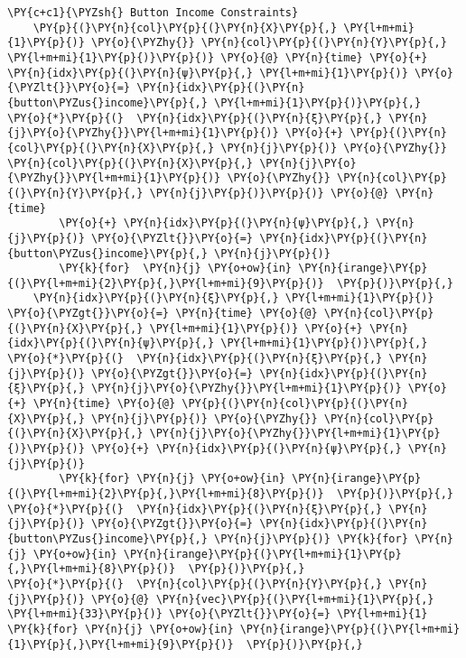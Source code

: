 \begin{tcolorbox}[breakable, size=fbox, boxrule=1pt, pad at break*=1mm,colback=cellbackground, colframe=cellborder]
\begin{Verbatim}[commandchars=\\\{\}]
    \PY{c+c1}{\PYZsh{} Button Income Constraints}
    \PY{p}{(}\PY{n}{col}\PY{p}{(}\PY{n}{X}\PY{p}{,} \PY{l+m+mi}{1}\PY{p}{)} \PY{o}{\PYZhy{}} \PY{n}{col}\PY{p}{(}\PY{n}{Y}\PY{p}{,} \PY{l+m+mi}{1}\PY{p}{)}\PY{p}{)} \PY{o}{@} \PY{n}{time} \PY{o}{+} \PY{n}{idx}\PY{p}{(}\PY{n}{ψ}\PY{p}{,} \PY{l+m+mi}{1}\PY{p}{)} \PY{o}{\PYZlt{}}\PY{o}{=} \PY{n}{idx}\PY{p}{(}\PY{n}{button\PYZus{}income}\PY{p}{,} \PY{l+m+mi}{1}\PY{p}{)}\PY{p}{,}
\PY{o}{*}\PY{p}{(}  \PY{n}{idx}\PY{p}{(}\PY{n}{ξ}\PY{p}{,} \PY{n}{j}\PY{o}{\PYZhy{}}\PY{l+m+mi}{1}\PY{p}{)} \PY{o}{+} \PY{p}{(}\PY{n}{col}\PY{p}{(}\PY{n}{X}\PY{p}{,} \PY{n}{j}\PY{p}{)} \PY{o}{\PYZhy{}} \PY{n}{col}\PY{p}{(}\PY{n}{X}\PY{p}{,} \PY{n}{j}\PY{o}{\PYZhy{}}\PY{l+m+mi}{1}\PY{p}{)} \PY{o}{\PYZhy{}} \PY{n}{col}\PY{p}{(}\PY{n}{Y}\PY{p}{,} \PY{n}{j}\PY{p}{)}\PY{p}{)} \PY{o}{@} \PY{n}{time}
        \PY{o}{+} \PY{n}{idx}\PY{p}{(}\PY{n}{ψ}\PY{p}{,} \PY{n}{j}\PY{p}{)} \PY{o}{\PYZlt{}}\PY{o}{=} \PY{n}{idx}\PY{p}{(}\PY{n}{button\PYZus{}income}\PY{p}{,} \PY{n}{j}\PY{p}{)}
        \PY{k}{for}  \PY{n}{j} \PY{o+ow}{in} \PY{n}{irange}\PY{p}{(}\PY{l+m+mi}{2}\PY{p}{,}\PY{l+m+mi}{9}\PY{p}{)}  \PY{p}{)}\PY{p}{,}
    \PY{n}{idx}\PY{p}{(}\PY{n}{ξ}\PY{p}{,} \PY{l+m+mi}{1}\PY{p}{)} \PY{o}{\PYZgt{}}\PY{o}{=} \PY{n}{time} \PY{o}{@} \PY{n}{col}\PY{p}{(}\PY{n}{X}\PY{p}{,} \PY{l+m+mi}{1}\PY{p}{)} \PY{o}{+} \PY{n}{idx}\PY{p}{(}\PY{n}{ψ}\PY{p}{,} \PY{l+m+mi}{1}\PY{p}{)}\PY{p}{,}
\PY{o}{*}\PY{p}{(}  \PY{n}{idx}\PY{p}{(}\PY{n}{ξ}\PY{p}{,} \PY{n}{j}\PY{p}{)} \PY{o}{\PYZgt{}}\PY{o}{=} \PY{n}{idx}\PY{p}{(}\PY{n}{ξ}\PY{p}{,} \PY{n}{j}\PY{o}{\PYZhy{}}\PY{l+m+mi}{1}\PY{p}{)} \PY{o}{+} \PY{n}{time} \PY{o}{@} \PY{p}{(}\PY{n}{col}\PY{p}{(}\PY{n}{X}\PY{p}{,} \PY{n}{j}\PY{p}{)} \PY{o}{\PYZhy{}} \PY{n}{col}\PY{p}{(}\PY{n}{X}\PY{p}{,} \PY{n}{j}\PY{o}{\PYZhy{}}\PY{l+m+mi}{1}\PY{p}{)}\PY{p}{)} \PY{o}{+} \PY{n}{idx}\PY{p}{(}\PY{n}{ψ}\PY{p}{,} \PY{n}{j}\PY{p}{)}
        \PY{k}{for} \PY{n}{j} \PY{o+ow}{in} \PY{n}{irange}\PY{p}{(}\PY{l+m+mi}{2}\PY{p}{,}\PY{l+m+mi}{8}\PY{p}{)}  \PY{p}{)}\PY{p}{,}
\PY{o}{*}\PY{p}{(}  \PY{n}{idx}\PY{p}{(}\PY{n}{ξ}\PY{p}{,} \PY{n}{j}\PY{p}{)} \PY{o}{\PYZgt{}}\PY{o}{=} \PY{n}{idx}\PY{p}{(}\PY{n}{button\PYZus{}income}\PY{p}{,} \PY{n}{j}\PY{p}{)} \PY{k}{for} \PY{n}{j} \PY{o+ow}{in} \PY{n}{irange}\PY{p}{(}\PY{l+m+mi}{1}\PY{p}{,}\PY{l+m+mi}{8}\PY{p}{)}  \PY{p}{)}\PY{p}{,}
\PY{o}{*}\PY{p}{(}  \PY{n}{col}\PY{p}{(}\PY{n}{Y}\PY{p}{,} \PY{n}{j}\PY{p}{)} \PY{o}{@} \PY{n}{vec}\PY{p}{(}\PY{l+m+mi}{1}\PY{p}{,} \PY{l+m+mi}{33}\PY{p}{)} \PY{o}{\PYZlt{}}\PY{o}{=} \PY{l+m+mi}{1} \PY{k}{for} \PY{n}{j} \PY{o+ow}{in} \PY{n}{irange}\PY{p}{(}\PY{l+m+mi}{1}\PY{p}{,}\PY{l+m+mi}{9}\PY{p}{)}  \PY{p}{)}\PY{p}{,}

\end{Verbatim}
\end{tcolorbox}
